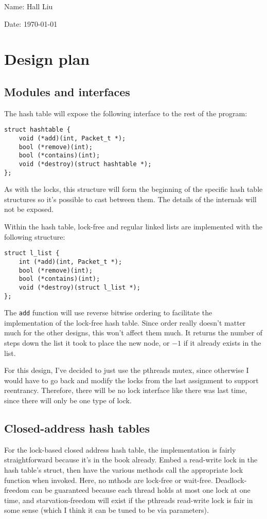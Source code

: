 \documentclass{article}
\begin{document}
Name: Hall Liu

Date: \today 
\vspace{1.5cm}

\section*{Design plan}
\subsection*{Modules and interfaces}
The hash table will expose the following interface to the rest of the program:
\begin{verbatim}
struct hashtable {
    void (*add)(int, Packet_t *);
    bool (*remove)(int);
    bool (*contains)(int);
    void (*destroy)(struct hashtable *);
};
\end{verbatim}
As with the locks, this structure will form the beginning of the specific hash table structures so it's possible to cast between them. The details of the internals will not be exposed.

Within the hash table, lock-free and regular linked lists are implemented with the following structure:
\begin{verbatim}
struct l_list {
    int (*add)(int, Packet_t *);
    bool (*remove)(int);
    bool (*contains)(int);
    void (*destroy)(struct l_list *);
};
\end{verbatim}
The \verb|add| function will use reverse bitwise ordering to facilitate the implementation of the lock-free hash table. Since order really doesn't matter much for the other designs, this won't affect them much. It returns the number of steps down the list it took to place the new node, or $-1$ if it already exists in the list.

For this design, I've decided to just use the pthreads mutex, since otherwise I would have to go back and modify the locks from the last assignment to support reentrancy. Therefore, there will be no lock interface like there was last time, since there will only be one type of lock.
\subsection*{Closed-address hash tables}
For the lock-based closed address hash table, the implementation is fairly straightforward because it's in the book already. Embed a read-write lock in the hash table's struct, then have the various methods call the appropriate lock function when invoked. Here, no mthods are lock-free or wait-free. Deadlock-freedom can be guaranteed because each thread holds at most one lock at one time, and starvation-freedom will exist if the pthreads read-write lock is fair in some sense (which I think it can be tuned to be via parameters).
\end{document}
